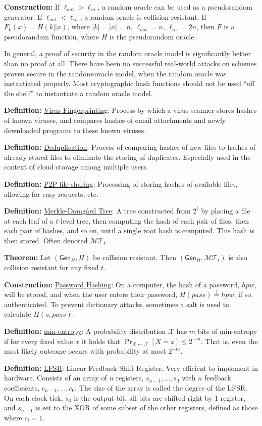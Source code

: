 \documentclass[10pt]{article}
\newcommand{\MMM}{\mathcal{M}}
\newcommand{\XXX}{\mathcal{X}}
\newcommand{\TTT}{\mathcal{T}}
\newcommand{\defn}[1]{{\bf Definition:} \underline{#1}}
\newcommand{\thm}[1]{{\bf Theorem:} \underline{#1}}
\newcommand{\con}[1]{{\bf Construction:} \underline{#1}}
\newcommand{\Gen}{\mathsf{Gen}}
\newcommand{\from}{\leftarrow}
\begin{document}
\begin{multicols}{3}
\con{} If $\ell_{out}>\ell_{in}$, a random oracle can be used as a pseudorandom generator. If $\ell_{out}<\ell_{in}$, a random oracle is collision resistant. If $F_k(x)=H(k||x)$, where $|k|=|x|=n$, $\ell_{out}=n$, $\ell_{in}=2n$, then $F$ is a pseudorandom function, where $H$ is the pseudorandom oracle.

In general, a proof of security in the random oracle model is significantly better than no proof at all. There have been no successful real-world attacks on schemes proven secure in the random-oracle model, when the random oracle was instantiated properly. Most cryptographic hash functions should not be used ``off the shelf'' to instantiate a random oracle model.

\defn{Virus Fingerprinting}: Process by which a virus scanner stores hashes of known viruses, and compares hashes of email attachments and newly downloaded programs to these known viruses.

\defn{Deduplication}: Process of comparing hashes of new files to hashes of already stored files to eliminate the storing of duplicates. Especially used in the context of cloud storage among multiple users.

\defn{P2P file-sharing}: Processing of storing hashes of available files, allowing for easy requests, etc.

\defn{Merkle-Damg\r{a}rd Tree}: A tree constructed from $2^t$ by placing a file at each leaf of a $t$-level tree, then computing the hash of each pair of files, then each pair of hashes, and so on, until a single root hash is computed. This hash is then stored. Often denoted $\MMM\TTT_t$.

\thm{}Let $(\Gen_H,H)$ be collision resistant. Then $(\Gen_H,\MMM\TTT_t)$ is also collision resistant for any fixed $t$.

\con{Password Hashing}: On a computer, the hash of a password, $hpw$, will be stored, and when the user enters their password, $H(pass)\overset{?}{=}hpw$, if so, authenticated. To prevent dictionary attacks, sometimes a salt is used to calculate $H(s,pass)$.

\defn{min-entropy}: A probability distribution $\XXX$ has $m$ bits of min-entropy if for every fixed value $x$ it holds that $\Pr_{X\from\XXX}[X=x]\leq2^{-m}$. That is, even the most likely outcome occurs with probability at most $2^{-m}$.

\defn{LFSR}: Linear Feedback Shift Register. Very efficient to implement in hardware. Consists of an array of $n$ registers, $s_{n-1},\dots,s_0$ with $n$ feedback coefficients, $c_{n-1},\dots,c_0$. The size of the array is called the degree of the LFSR. On each clock tick, $s_0$ is the output bit, all bits are shifted right by 1 register, and $s_{n-1}$ is set to the XOR of some subset of the other registers, defined as those where $c_i=1$.


\end{multicols}
\end{document}
